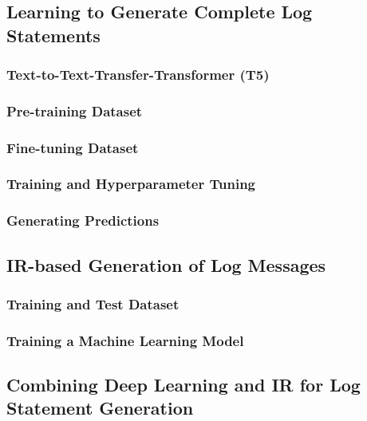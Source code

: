 \section{\approach} \label{sec:approach}

\subsection{Learning to Generate Complete Log Statements}

\subsubsection{Text-to-Text-Transfer-Transformer (T5)}


\subsubsection{Pre-training Dataset}


\subsubsection{Fine-tuning Dataset}


\subsubsection{Training and Hyperparameter Tuning}


\subsubsection{Generating Predictions}


\subsection{IR-based Generation of Log Messages}


\subsubsection{Training and Test Dataset}


\subsubsection{Training a Machine Learning Model}


\subsection{Combining Deep Learning and IR for Log Statement Generation}